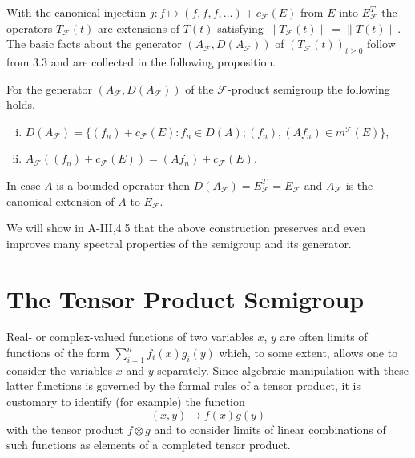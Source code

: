 With the canonical injection $j \colon f \mapsto (f,f,f,\ldots) + c_{\mathcal{F}}(E)$ from $E$ into $E_{\mathcal{F}}^{T}$ the operators $T_{\mathcal{F}}(t)$ are extensions of $T(t)$ satisfying $\|T_{\mathcal{F}}(t)\| = \|T(t)\|$. The basic facts about the generator $(A_{\mathcal{F}},D(A_{\mathcal{F}}))$ of $(T_{\mathcal{F}}(t))_{t \geq 0}$ follow from 3.3 and are collected in the following proposition.
\begin{proposition}\label{prop:a1-3.6}
For the generator $(A_{\mathcal{F}},D(A_{\mathcal{F}}))$ of the $\mathcal{F}$-product semigroup the following holds.
\begin{enumerate}[(i)]
\item 
$D(A_{\mathcal{F}}) = \{(f_{n}) + c_{\mathcal{F}}(E) \colon f_{n} \in D(A); (f_{n}), (Af_{n}) \in m^{\mathcal{T}}(E)\}$,

\item 
$A_{\mathcal{F}}((f_{n}) + c_{\mathcal{F}}(E)) = (Af_{n}) + c_{\mathcal{F}}(E)$.

\end{enumerate}
\end{proposition}
In case $A$ is a bounded operator then $D(A_{\mathcal{F}}) = E_{\mathcal{F}}^{T} = E_{\mathcal{F}}$ and $A_{\mathcal{F}}$ is the canonical extension of $A$ to $E_{\mathcal{F}}$.

We will show in A-III,4.5 that the above construction preserves and even improves many spectral properties of the semigroup and its generator.

\section{The Tensor Product Semigroup}\label{sec:a1-3.7}

Real- or complex-valued functions of two variables $x$, $y$ are often limits of functions of the form $\sum_{i=1}^{n} f_{i}(x)g_{i}(y)$ which, to some extent, allows one to consider the variables $x$ and $y$ separately.
Since algebraic manipulation with these latter functions is governed by the formal rules of a tensor product, it is customary to identify (for example) the function
\[
    (x,y) \mapsto f(x)g(y)
\]
with the tensor product $f \otimes g$ and to consider limits of linear combinations of such functions as elements of a completed tensor product.

